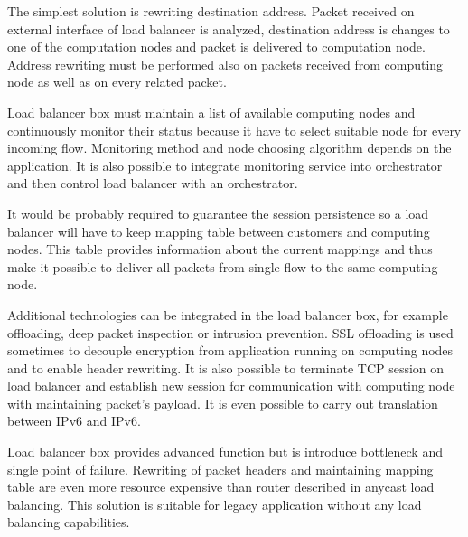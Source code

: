 The simplest solution is rewriting destination address. Packet received on external interface of load balancer is analyzed, destination address is changes to one of the computation nodes and packet is delivered to computation node. Address rewriting must be performed also on packets received from computing node as well as on every related packet. 

Load balancer box must maintain a list of available computing nodes and continuously monitor their status because it have to select suitable node for every incoming flow. Monitoring method and node choosing algorithm depends on the application. It is also possible to integrate monitoring service into orchestrator and then control load balancer with an orchestrator.

It would be probably required to guarantee the session persistence so a load balancer will have to keep mapping table between customers and computing nodes. This table provides information about the current mappings and thus make it possible to deliver all packets from single flow to the same computing node.

Additional technologies can be integrated in the load balancer box, for example offloading, deep packet inspection or intrusion prevention. \Ac{SSL} offloading is used sometimes to decouple encryption from application running on computing nodes and to enable header rewriting. It is also possible to terminate \Ac{TCP} session on load balancer and establish new session for communication with computing node with maintaining packet's payload. It is even possible to carry out translation between \Ac{IPv6} and \Ac{IPv6}.

Load balancer box provides advanced function but is introduce bottleneck and single point of failure. Rewriting of packet headers and maintaining mapping table are even more resource expensive than router described in anycast load balancing. This solution is suitable for legacy application without any load balancing capabilities. 



